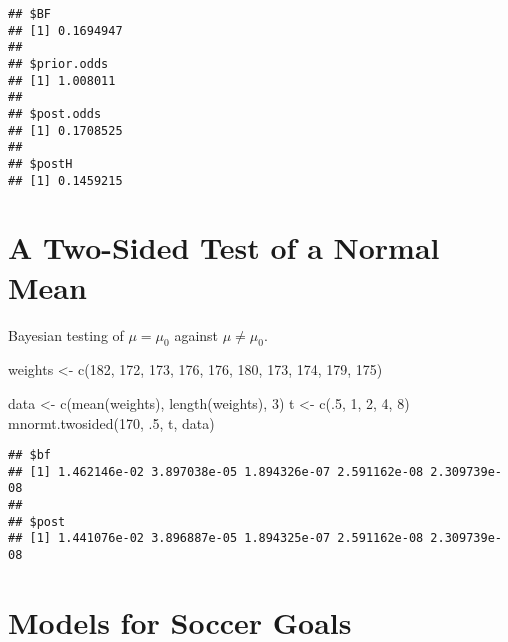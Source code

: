 \documentclass[
]{book}
\newenvironment{Shaded}{\begin{snugshade}}{\end{snugshade}}
\newcommand{\DecValTok}[1]{\textcolor[rgb]{0.00,0.00,0.81}{#1}}
\newcommand{\FunctionTok}[1]{\textcolor[rgb]{0.00,0.00,0.00}{#1}}
\newcommand{\NormalTok}[1]{#1}
\newcommand{\OtherTok}[1]{\textcolor[rgb]{0.56,0.35,0.01}{#1}}
\begin{document}
\begin{verbatim}
## $BF
## [1] 0.1694947
## 
## $prior.odds
## [1] 1.008011
## 
## $post.odds
## [1] 0.1708525
## 
## $postH
## [1] 0.1459215
\end{verbatim}

\hypertarget{a-two-sided-test-of-a-normal-mean}{%
\section{A Two-Sided Test of a Normal Mean}\label{a-two-sided-test-of-a-normal-mean}}

Bayesian testing of \(\mu = \mu_0\) against \(\mu \neq \mu_0\).

\begin{Shaded}
\begin{Highlighting}[]
\NormalTok{weights }\OtherTok{\textless{}{-}} \FunctionTok{c}\NormalTok{(}\DecValTok{182}\NormalTok{, }\DecValTok{172}\NormalTok{, }\DecValTok{173}\NormalTok{, }\DecValTok{176}\NormalTok{, }\DecValTok{176}\NormalTok{, }\DecValTok{180}\NormalTok{,}
             \DecValTok{173}\NormalTok{, }\DecValTok{174}\NormalTok{, }\DecValTok{179}\NormalTok{, }\DecValTok{175}\NormalTok{)}
\end{Highlighting}
\end{Shaded}

\begin{Shaded}
\begin{Highlighting}[]
\NormalTok{data }\OtherTok{\textless{}{-}} \FunctionTok{c}\NormalTok{(}\FunctionTok{mean}\NormalTok{(weights), }\FunctionTok{length}\NormalTok{(weights), }\DecValTok{3}\NormalTok{)}
\NormalTok{t }\OtherTok{\textless{}{-}} \FunctionTok{c}\NormalTok{(.}\DecValTok{5}\NormalTok{, }\DecValTok{1}\NormalTok{, }\DecValTok{2}\NormalTok{, }\DecValTok{4}\NormalTok{, }\DecValTok{8}\NormalTok{)}
\FunctionTok{mnormt.twosided}\NormalTok{(}\DecValTok{170}\NormalTok{, .}\DecValTok{5}\NormalTok{, t, data)}
\end{Highlighting}
\end{Shaded}

\begin{verbatim}
## $bf
## [1] 1.462146e-02 3.897038e-05 1.894326e-07 2.591162e-08 2.309739e-08
## 
## $post
## [1] 1.441076e-02 3.896887e-05 1.894325e-07 2.591162e-08 2.309739e-08
\end{verbatim}

\hypertarget{models-for-soccer-goals}{%
\section{Models for Soccer Goals}\label{models-for-soccer-goals}}
\end{document}
